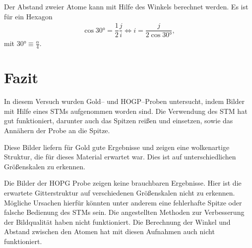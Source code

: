 \documentclass[sn-mathphys-num,iicol]{sn-jnl}
\theoremstyle{thmstyleone}
\theoremstyle{thmstyletwo}
\theoremstyle{thmstylethree}
\begin{document}
Der Abstand zweier Atome kann mit Hilfe des Winkels berechnet werden.
Es ist für ein Hexagon
\begin{align} 
  \cos \ang{30}=\dfrac{1}{2}\dfrac{j}{i}\Leftrightarrow i=\dfrac{j}{2\cos \ang{30}}
,\end{align} 
mit $\ang{30}\equiv \tfrac{\alpha }{4}$.

\section{Fazit}
In diesem Versuch wurden Gold-- und HOGP--Proben untersucht, indem Bilder mit Hilfe eines STMs aufgenommen worden sind.
Die Verwendung des STM hat gut funktioniert, darunter auch das Spitzen reißen und einsetzen, sowie das Annähern der Probe an die Spitze.

Diese Bilder liefern für Gold gute Ergebnisse und zeigen eine wolkenartige Struktur, die für dieses Material erwartet war.
Dies ist auf unterschiedlichen Größenskalen zu erkennen.

Die Bilder der HOPG Probe zeigen keine brauchbaren Ergebnisse.
Hier ist die erwartete Gitterstruktur auf verschiedenen Größenskalen nicht zu erkennen.
Mögliche Ursachen hierfür könnten unter anderem eine fehlerhafte Spitze oder falsche Bedienung des STMs sein.
Die angestellten Methoden zur Verbesserung der Bildqualität haben nicht funktioniert.
Die Berechnung der Winkel und Abstand zwischen den Atomen hat mit diesen Aufnahmen auch nicht funktioniert.



\clearpage
\end{document}
